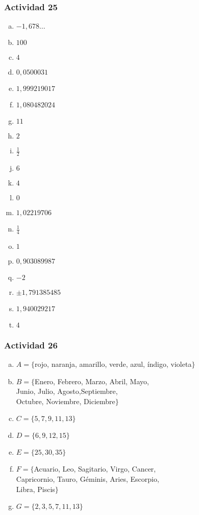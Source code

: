 \documentclass[a4paper, twocolumn]{article}
\begin{document}
\subsubsection*{Actividad 25}
\begin{enumerate}[a)]
\item $-1,678\dots$
\item $100$
\item $4$
\item $0,0500031$
\item $1,999219017$
\item $1,080482024$
\item $11$
\item $2$
\item $\frac{1}{2}$
\item $6$
\item $4$
\item $0$
\item $1,02219706$
\item $\frac{1}{4}$
\item $1$
\item $0,903089987$
\item $-2$
\item $\pm 1,791385485$
\item $1,940029217$
\item $4$
\end{enumerate}




\subsubsection*{Actividad 26}
\begin{enumerate}[a)]
\item $A=\{$rojo, naranja, amarillo, verde, azul, índigo, violeta$\}$
\item $B=\{$Enero, Febrero, Marzo, Abril, Mayo, \\
 Junio, Julio, Agosto,Septiembre,  \\
Octubre, Noviembre, Diciembre$\}$
\item $C=\{5, 7, 9, 11, 13\}$
\item $D=\{6, 9, 12, 15\}$
\item $E=\{25, 30, 35\}$
\item $F=\{$Acuario, Leo, Sagitario, Virgo,
 Cancer, \\
Capricornio, Tauro, Géminis, Aries, Escorpio, \\
Libra, Piscis$\}$
\item $G=\{2,3,5,7,11,13\}$ 
\end{enumerate}
\end{document}
